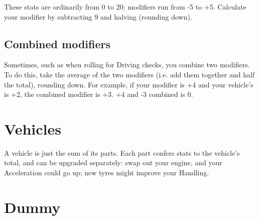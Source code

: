 \documentclass[10pt, a4paper, twocolumn]{article}
\begin{document}
These stats are ordinarily from 0 to 20; modifiers
run from -5 to +5. Calculate your modifier by subtracting 9 and halving
(rounding down).

\subsection{Combined modifiers}
Sometimes, such as when rolling for Driving checks, you combine two
modifiers. To do this, take the average of the two modifiers (i.e. add them
together and half the total), rounding down. For example, if your 
modifier is +4 and your vehicle's  is +2, the combined modifier is +3. 
+4 and -3 combined is 0.

\section{Vehicles}
A vehicle is just the sum of its parts. Each part confers stats to the vehicle's
total, and can be upgraded separately: swap out your engine, and your
Acceleration could go up; new tyres might improve your Handling.

\section{Dummy}
\lipsum{}
\end{document}
